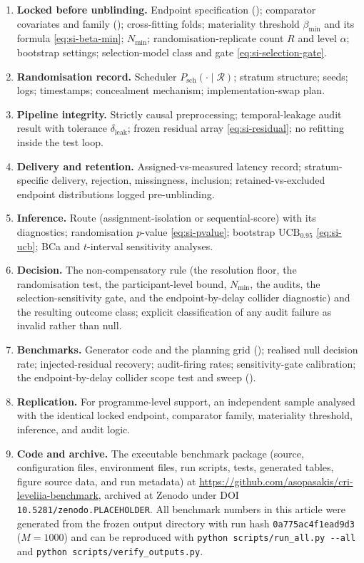 \documentclass[11pt,a4paper]{article}
\theoremstyle{definition}
\newcommand{\UCB}{\mathrm{UCB}_{0.95}}
\begin{document}
\begin{enumerate}[leftmargin=1.6em,itemsep=3pt]
\item \textbf{Locked before unblinding.} Endpoint specification
(); comparator covariates and family
(); cross-fitting folds; materiality threshold
\(\beta_{\min}\) and its formula \eqref{eq:si-beta-min}; \(N_{\min}\);
randomisation-replicate count \(R\) and level \(\alpha\); bootstrap settings;
selection-model class and gate \eqref{eq:si-selection-gate}.
\item \textbf{Randomisation record.} Scheduler
\(P_{\mathrm{sch}}(\cdot\mid\mathcal{R})\); stratum structure; seeds; logs;
timestamps; concealment mechanism; implementation-swap plan.
\item \textbf{Pipeline integrity.} Strictly causal preprocessing; temporal-leakage
audit result with tolerance \(\delta_{\mathrm{leak}}\); frozen residual array
\eqref{eq:si-residual}; no refitting inside the test loop.
\item \textbf{Delivery and retention.} Assigned-vs-measured latency record;
stratum-specific delivery, rejection, missingness, inclusion; retained-vs-excluded
endpoint distributions logged pre-unblinding.
\item \textbf{Inference.} Route (assignment-isolation or sequential-score) with
its diagnostics; randomisation \(p\)-value \eqref{eq:si-pvalue}; bootstrap
\(\UCB\) \eqref{eq:si-ucb}; BCa and \(t\)-interval sensitivity analyses.
\item \textbf{Decision.} The non-compensatory rule (the resolution floor, the
randomisation test, the participant-level bound, \(N_{\min}\), the audits, the
selection-sensitivity gate, and the endpoint-by-delay collider diagnostic) and the
resulting outcome class; explicit classification of any audit failure as invalid
rather than null.
\item \textbf{Benchmarks.} Generator code and the planning grid
(); realised null decision rate; injected-residual recovery;
audit-firing rates; sensitivity-gate calibration; the endpoint-by-delay collider
scope test and sweep ().
\item \textbf{Replication.} For programme-level support, an independent sample
analysed with the identical locked endpoint, comparator family, materiality
threshold, inference, and audit logic.
\item \textbf{Code and archive.} The executable benchmark package (source,
configuration files, environment files, run scripts, tests, generated tables,
figure source data, and run metadata) at
\url{https://github.com/asopasakis/cri-leveliia-benchmark}, archived at Zenodo under
DOI \texttt{10.5281/zenodo.PLACEHOLDER}. All benchmark numbers in this article were
generated from the frozen output directory with run hash \texttt{0a775ac4f1ead9d3}
(\(M=1000\)) and can be reproduced with
\texttt{python scripts/run\_all.py -{}-all} and
\texttt{python scripts/verify\_outputs.py}.
\end{enumerate}
\end{document}
